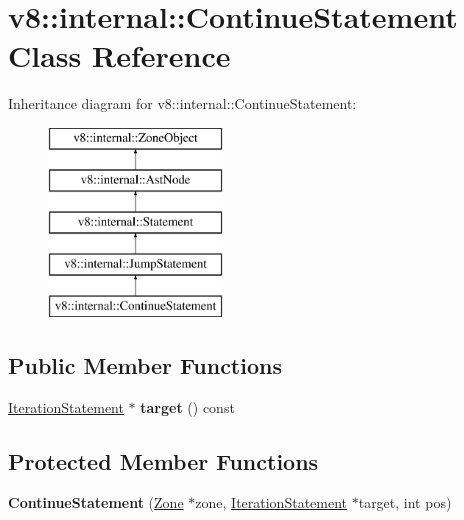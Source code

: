 \hypertarget{classv8_1_1internal_1_1_continue_statement}{}\section{v8\+:\+:internal\+:\+:Continue\+Statement Class Reference}
\label{classv8_1_1internal_1_1_continue_statement}
Inheritance diagram for v8\+:\+:internal\+:\+:Continue\+Statement\+:\begin{figure}[H]
\begin{center}
\leavevmode
\includegraphics[height=5.000000cm]{classv8_1_1internal_1_1_continue_statement}
\end{center}
\end{figure}
\subsection*{Public Member Functions}
\begin{DoxyCompactItemize}
\item 
\hyperlink{classv8_1_1internal_1_1_iteration_statement}{Iteration\+Statement} $\ast$ {\bfseries target} () const \hypertarget{classv8_1_1internal_1_1_continue_statement_a6955a107e0c7be063e5d48a17607c0ea}{}\label{classv8_1_1internal_1_1_continue_statement_a6955a107e0c7be063e5d48a17607c0ea}

\end{DoxyCompactItemize}
\subsection*{Protected Member Functions}
\begin{DoxyCompactItemize}
\item 
{\bfseries Continue\+Statement} (\hyperlink{classv8_1_1internal_1_1_zone}{Zone} $\ast$zone, \hyperlink{classv8_1_1internal_1_1_iteration_statement}{Iteration\+Statement} $\ast$target, int pos)\hypertarget{classv8_1_1internal_1_1_continue_statement_a31905a376a31c4683e4aa23551bd7b5c}{}\label{classv8_1_1internal_1_1_continue_statement_a31905a376a31c4683e4aa23551bd7b5c}

\end{DoxyCompactItemize}
